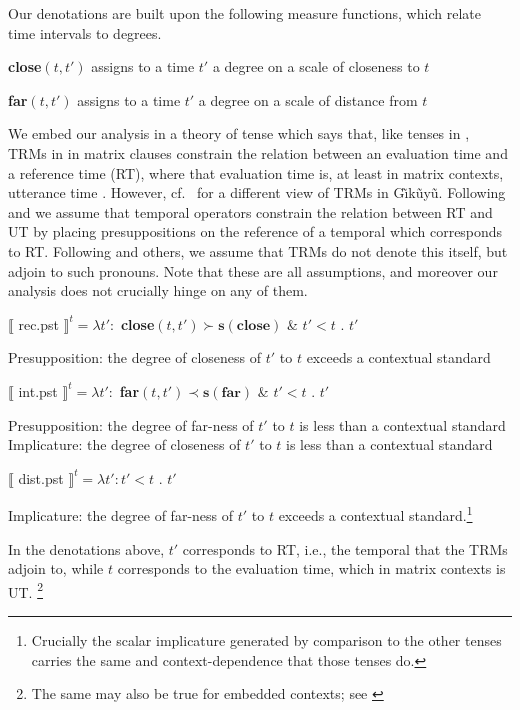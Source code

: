 \documentclass[output=paper,
modfonts
]{langscibook}
\begin{document}
Our denotations are built upon the following measure functions, which relate time intervals to degrees.

\ea
 {\bf close}$(t, t')$ assigns to a time $t'$ a degree on a scale of closeness to $t$
\z

\ea
 {\bf far}$(t, t')$ assigns to a time $t'$ a degree on a scale of distance from $t$
\z

We embed our analysis in a theory of tense which says that, like tenses in , TRMs in  in matrix clauses constrain the relation between an evaluation time and a reference time (RT), where that evaluation time is, at least in matrix contexts, utterance time \citep{reichenbach47tenses, klein94time}. However, cf.~\citet{cable12beyond,cable14nels45} for a different view of TRMs in G\~\i k\~uy\~u.
Following \citet{heim94comments} and \citet{kratzer98more} we assume that temporal operators constrain the relation between RT and UT by placing presuppositions on the reference of a temporal  which corresponds to RT.
Following \citet{cable12beyond} and others, we assume that TRMs do not denote this  itself, but adjoin to such pronouns.
Note that these are all assumptions, and moreover our analysis does not crucially hinge on any of them.


\ea\label{recent}
$\llbracket$ {\sc rec.pst} $\rrbracket^t = \lambda t': $ {\bf close}$(t, t') \succ \textbf{s}(\textbf{close})$ \& $t' < t$ . $t'$ 

Presupposition: the degree of closeness of $t'$ to $t$ exceeds a contextual standard 
\z

\ea\label{intermediate}
$\llbracket$ {\sc int.pst} $\rrbracket^t = \lambda t': $ {\bf far}$(t, t') \prec \textbf{s}(\textbf{far})$ \& $t' < t$ . $t'$

Presupposition: the degree of far-ness of $t'$ to $t$ is less than a contextual standard \\
Implicature: the degree of closeness of $t'$ to $t$ is less than a contextual standard 
\z

\ea\label{distant}
$\llbracket$ {\sc dist.pst} $\rrbracket^t = \lambda t': %
t' < t$ . $t'$

Implicature: the degree of far-ness of $t'$ to $t$ exceeds a contextual standard.\footnote{Crucially the scalar implicature generated by comparison to the other tenses carries the same  and context-dependence that those tenses do.} 
\z

In the denotations above, $t'$ corresponds to RT, i.e., the temporal  that the TRMs adjoin to, while $t$ corresponds to the evaluation time, which in matrix contexts is UT.%
\footnote{The same may also be true for embedded contexts; see \citet{cable12beyond}}
\end{document}
